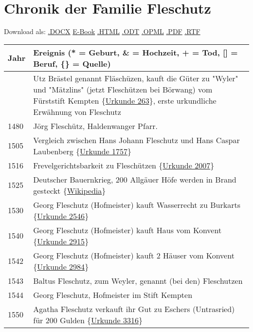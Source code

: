 \documentclass[
]{article}
\author{}
\date{}
\begin{document}
\section{Chronik der Familie Fleschutz}\label{header-n0}

Download als: \href{Chronik.docx}{.DOCX} \textbar{}
\href{Chronik.epub}{E-Book} \textbar{} \href{Chronik.html}{.HTML}
\textbar{} \href{Chronik.odt}{.ODT} \textbar{}
\href{Chronik.opml}{.OPML} \textbar{} \href{Chronik.pdf}{.PDF}
\textbar{} \href{Chronik.rtf}{.RTF}

\begin{longtable}[]{@{}ll@{}}
\toprule\noalign{}
Jahr & Ereignis (* = Geburt, \& = Hochzeit, + = Tod, {[}{]} = Beruf,
\{\} = Quelle) \\
\midrule\noalign{}
\endhead
\bottomrule\noalign{}
\endlastfoot
1412 & Utz Brästel genannt Fläschüzen, kauft die Güter zu "Wyler" und
"Mätzlins" (jetzt Fleschützen bei Börwang) vom Fürststift Kempten
\{\href{Quellen/Fuerststift_Kempten/Urkunde_263/}{Urkunde 263}\}, erste
urkundliche Erwähnung von Fleschutz \\
1480 & Jörg Fleschütz, Haldenwanger Pfarr. \\
1505 & Vergleich zwischen Hans Johann Fleschutz und Hans Caspar
Laubenberg \{\href{Quellen/Fuerststift_Kempten/Urkunde_1757/}{Urkunde
1757}\} \\
1516 & Frevelgerichtsbarkeit zu Fleschützen
\{\href{Quellen/Fuerststift_Kempten/Urkunde_2007/}{Urkunde 2007}\} \\
1525 & Deutscher Bauernkrieg, 200 Allgäuer Höfe werden in Brand gesteckt
\{\href{Quellen/Wikipedia/Deutscher_Bauernkrieg/}{Wikipedia}\} \\
1530 & Georg Fleschutz (Hofmeister) kauft Wasserrecht zu Burkarts
\{\href{Quellen/Fuerststift_Kempten/Urkunde_2546/}{Urkunde 2546}\} \\
1540 & Georg Fleschutz (Hofmeister) kauft Haus vom Konvent
\{\href{Quellen/Fuerststift_Kempten/Urkunde_2915/}{Urkunde 2915}\} \\
1542 & Georg Fleschutz (Hofmeister) kauft 2 Häuser vom Konvent
\{\href{Quellen/Fuerststift_Kempten/Urkunde_2984}{Urkunde 2984}\} \\
1543 & Baltus Fleschutz, zum Weyler, genannt (bei den) Fleschutzen \\
1544 & Georg Fleschutz, Hofmeister im Stift Kempten \\
1550 & Agatha Fleschutz verkauft ihr Gut zu Eschers (Untrasried) für 200
Gulden \{\href{Quellen/Fuerststift_Kempten/Urkunde_3316}{Urkunde
3316}\} \\

\end{longtable}
\end{document}
